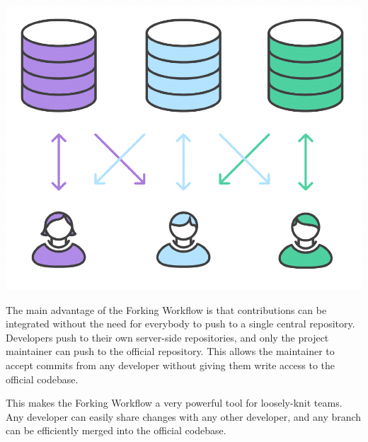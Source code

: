 \documentclass{article}
\begin{document}
\begin{center}
\includegraphics[scale=0.5]{figures/15.pdf}
\end{center}

The main advantage of the Forking Workflow is that contributions can
be integrated without the need for everybody to push to a single
central repository. Developers push to their own server-side
repositories, and only the project maintainer can push to the official
repository. This allows the maintainer to accept commits from any
developer without giving them write access to the official codebase.

This makes the Forking Workflow a very powerful tool for loosely-knit
teams. Any developer can easily share changes with any other
developer, and any branch can be efficiently merged into the official
codebase.


\fi 
\end{document}
